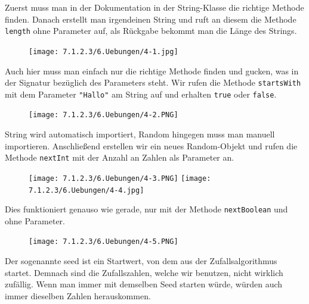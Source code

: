 \documentclass{scrartcl}   %
\begin{document}
\begin{itemize}
    \barrow Zuerst muss man in der Dokumentation in der String-Klasse die richtige Methode finden. Danach erstellt man irgendeinen String und ruft an diesem die Methode \texttt{length} ohne Parameter auf, als Rückgabe bekommt man die Länge des Strings.
    
    \begin{figure}[ht]
	    \centering
	    \texttt{[image: 7.1.2.3/6.Uebungen/4-1.jpg]}
    \end{figure}
    
    \barrow Auch hier muss man einfach nur die richtige Methode finden und gucken, was in der Signatur bezüglich des Parameters steht. Wir rufen die Methode \texttt{startsWith} mit dem Parameter \texttt{"Hallo"} am String auf und erhalten \texttt{true} oder \texttt{false}.
    
    \begin{figure}[ht]
	    \centering
	    \texttt{[image: 7.1.2.3/6.Uebungen/4-2.PNG]}
    \end{figure}
	    
    \barrow String wird automatisch importiert, Random hingegen muss man manuell importieren. Anschließend erstellen wir ein neues Random-Objekt und rufen die Methode \texttt{nextInt} mit der Anzahl an Zahlen als Parameter an.
    
    \begin{figure}[ht]
	    \centering
	    \texttt{[image: 7.1.2.3/6.Uebungen/4-3.PNG]}
	    \hspace{1cm}
	    \texttt{[image: 7.1.2.3/6.Uebungen/4-4.jpg]}
    \end{figure}
    
    \newpage
    
    \barrow Dies funktioniert genauso wie gerade, nur mit der Methode \texttt{nextBoolean} und ohne Parameter.
    
    \begin{figure}[ht]
	    \centering
	    \texttt{[image: 7.1.2.3/6.Uebungen/4-5.PNG]}
    \end{figure}
    
    \vspace{2cm}
    
    \barrow Der sogenannte \glqq seed\grqq{} ist ein Startwert, von dem aus der Zufallsalgorithmus startet. Demnach sind die Zufallszahlen, welche wir benutzen, nicht wirklich zufällig. Wenn man immer mit demselben Seed starten würde, würden auch immer dieselben Zahlen herauskommen.
    

\end{itemize}
\end{document}
